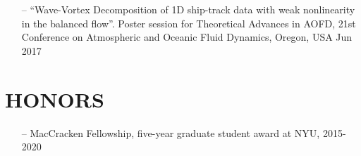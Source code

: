 \documentclass[margin]{res}
\begin{document}
\begin{resume}
\begin{itemize}[leftmargin=*,noitemsep]
\item[--] “Wave-Vortex Decomposition of 1D ship-track data with weak nonlinearity in the balanced flow”. Poster session for Theoretical Advances in AOFD, 21st Conference on Atmospheric and Oceanic Fluid Dynamics, Oregon, USA Jun 2017
\end{itemize}

\section{{\normalfont HONORS}}\begin{itemize}[leftmargin=*,noitemsep]
\item[--]{MacCracken Fellowship, five-year graduate student award at NYU, 2015-2020}
\end{itemize}


 

\end{resume}
\end{document}

